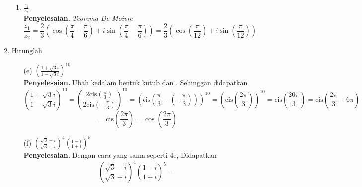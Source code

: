 \documentclass{article}
\begin{document}
\begin{enumerate}
\begin{enumerate}
        \item $\frac{z_1}{z_2}$\\
        \textbf{Penyelesaian. } \textit{Teorema De Moivre} 
        \[\frac{z_1}{z_2}=\frac{2}{3}\left(\cos{\left(\frac{\pi}{4}-\frac{\pi}{6}\right)}+i\sin{\left(\frac{\pi}{4}-\frac{\pi}{6}\right)}\right)=\frac{2}{3}\left(\cos{\left(\frac{\pi}{12}\right)}+i\sin{\left(\frac{\pi}{12}\right)}\right)\]
    \end{enumerate}

    \item Hitunglah
    \begin{enumerate}
        \item[(e)]$\left(\frac{1+\sqrt{3}i}{1-\sqrt{3}i}\right)^{10}$\\
        \textbf{Penyelesaian. } Ubah kedalam bentuk kutub   dan
        . Sehinggan didapatkan
        \[\left(\frac{1+\sqrt{3}i}{1-\sqrt{3}i}\right)^{10}=\left(\frac{2\textrm{cis}\left(\frac{\pi}{3}\right)}{2\textrm{cis}\left(-\frac{\pi}{3}\right)}\right)^{10}=\left(\textrm{cis}\left(\frac{\pi}{3}-\left(-\frac{\pi}{3}\right)\right)\right)^{10}=\left(\textrm{cis}\left(\frac{2\pi}{3}\right)\right)^{10}=\textrm{cis}\left(\frac{20\pi}{3}\right)=\textrm{cis}\left(\frac{2\pi}{3}+6\pi\right)\]
        \[=\textrm{cis}\left(\frac{2\pi}{3}\right)=\cos\left(\frac{2\pi}{3}\right)\]
        \item[(f)] $\left(\frac{\sqrt{3}-i}{\sqrt{3}+i}\right)^4\left(\frac{1-i}{1+i}\right)^5$\\
        \textbf{Penyelesaian. } Dengan cara yang sama seperti 4e, Didapatkan
        \[\left(\frac{\sqrt{3}-i}{\sqrt{3}+i}\right)^4\left(\frac{1-i}{1+i}\right)^5=\]
    \end{enumerate}
\end{enumerate}
\end{document}
